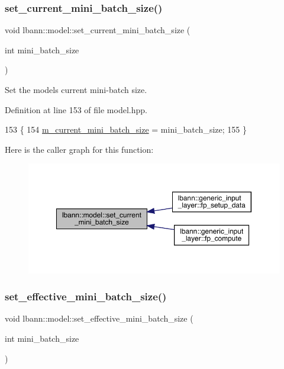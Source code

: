 \subsubsection{\texorpdfstring{set\+\_\+current\+\_\+mini\+\_\+batch\+\_\+size()}{set\_current\_mini\_batch\_size()}}
{\footnotesize\ttfamily void lbann\+::model\+::set\+\_\+current\+\_\+mini\+\_\+batch\+\_\+size (\begin{DoxyParamCaption}\item[{int}]{mini\+\_\+batch\+\_\+size }\end{DoxyParamCaption})\hspace{0.3cm}{\ttfamily [inline]}}

Set the model\textquotesingle{}s current mini-\/batch size. 

Definition at line 153 of file model.\+hpp.


\begin{DoxyCode}
153                                                                \{
154     \hyperlink{classlbann_1_1model_a982cea92d230bab5a47df504f02daf98}{m\_current\_mini\_batch\_size} = mini\_batch\_size;
155   \}
\end{DoxyCode}
Here is the caller graph for this function\+:\nopagebreak
\begin{figure}[H]
\begin{center}
\leavevmode
\includegraphics[width=350pt]{classlbann_1_1model_a4f3cc91f8495870723389be15f77184a_icgraph}
\end{center}
\end{figure}
\mbox{\label{classlbann_1_1model_aa64829cba8a84928a396893172a1d116}} 
\subsubsection{\texorpdfstring{set\+\_\+effective\+\_\+mini\+\_\+batch\+\_\+size()}{set\_effective\_mini\_batch\_size()}}
{\footnotesize\ttfamily void lbann\+::model\+::set\+\_\+effective\+\_\+mini\+\_\+batch\+\_\+size (\begin{DoxyParamCaption}\item[{int}]{mini\+\_\+batch\+\_\+size }\end{DoxyParamCaption})\hspace{0.3cm}{\ttfamily [inline]}}

